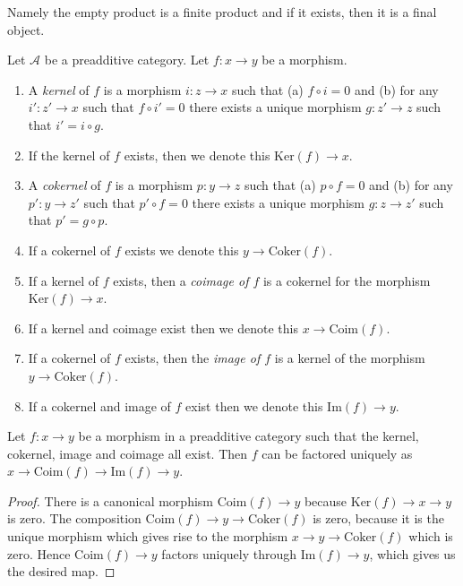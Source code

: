\noindent
Namely the empty product is a finite product and
if it exists, then it is a final object.

\begin{definition}
\label{definition-kernel}
Let $\mathcal{A}$ be a preadditive category.
Let $f : x \to y$ be a morphism.
\begin{enumerate}
\item A {\it kernel} of $f$ is a morphism
$i : z \to x$ such that (a) $f \circ i = 0$ and (b)
for any $i' : z' \to x$ such that $f \circ i' = 0$ there
exists a unique morphism $g : z' \to z$ such that
$i' = i \circ g$.
\item If the kernel of $f$ exists, then we denote
this $\text{Ker}(f) \to x$.
\item A {\it cokernel} of $f$ is a morphism
$p : y \to z$ such that (a) $p \circ f = 0$ and (b)
for any $p' : y \to z'$ such that $p' \circ f = 0$ there
exists a unique morphism $g : z \to z'$ such that
$p' = g \circ p$.
\item If a cokernel of $f$ exists we denote this
$y \to \text{Coker}(f)$.
\item If a kernel of $f$ exists, then a {\it coimage
of $f$} is a cokernel for the morphism $\text{Ker}(f) \to x$.
\item If a kernel and coimage exist then we denote this
$x \to \text{Coim}(f)$.
\item If a cokernel of $f$ exists, then the {\it image of
$f$} is a kernel of the morphism $y \to \text{Coker}(f)$.
\item If a cokernel and image of $f$ exist then we denote
this $\text{Im}(f) \to y$.
\end{enumerate}
\end{definition}

\begin{lemma}
\label{lemma-coim-im-map}
Let $f : x \to y$ be a morphism in a preadditive category
such that the kernel, cokernel, image and coimage all exist.
Then $f$ can be factored uniquely as
$x \to \text{Coim}(f) \to \text{Im}(f) \to y$.
\end{lemma}

\begin{proof}
There is a canonical morphism $\text{Coim}(f) \to y$
because $\text{Ker}(f) \to x \to y$ is zero.
The composition $\text{Coim}(f) \to y \to \text{Coker}(f)$
is zero, because it is the unique morphism which gives
rise to the morphism $x \to y \to \text{Coker}(f)$ which
is zero. Hence $\text{Coim}(f) \to y$ factors uniquely through
$\text{Im}(f) \to y$, which gives us the desired map.
\end{proof}

